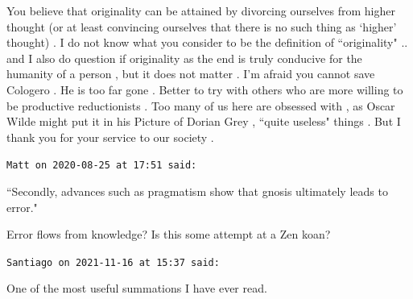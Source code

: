 \begin{footnotesize}
\begin{sffamily}
You believe that originality can be attained by divorcing ourselves from higher thought (or at least convincing ourselves that there is no such thing as `higher' thought) . I do not know what you consider to be the definition of ``originality" .. and I also do question if originality as the end is truly conducive for the humanity of a person , but it does not matter . I'm afraid you cannot save Cologero . He is too far gone . Better to try with others who are more willing to be productive reductionists . Too many of us here are obsessed with , as Oscar Wilde might put it in his Picture of Dorian Grey , ``quite useless" things . But I thank you for your service to our society .


\hfill

\texttt{Matt on 2020-08-25 at 17:51 said: }

``Secondly, advances such as pragmatism show that gnosis ultimately leads to error."

Error flows from knowledge? Is this some attempt at a Zen koan?


\hfill

\texttt{Santiago on 2021-11-16 at 15:37 said: }

One of the most useful summations I have ever read.


\end{sffamily}\end{footnotesize}
